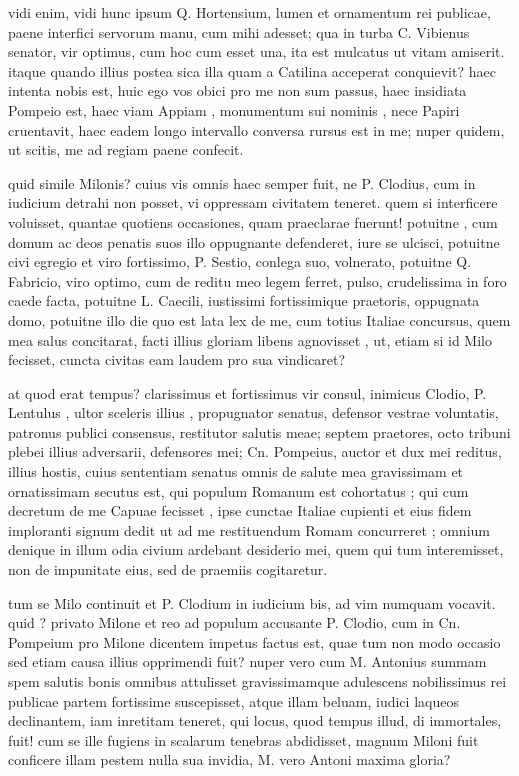  vidi enim, vidi hunc ipsum Q. Hortensium, lumen et ornamentum rei publicae, paene interfici servorum manu, cum mihi adesset; qua in turba C. Vibienus senator, vir optimus, cum hoc cum esset una, ita est mulcatus ut vitam amiserit. itaque quando illius postea sica illa quam a Catilina acceperat conquievit? haec intenta nobis est, huic ego vos obici pro me non sum passus, haec insidiata Pompeio est, haec viam Appiam , monumentum sui nominis , nece Papiri cruentavit, haec eadem longo intervallo conversa rursus est in me; nuper quidem, ut scitis, me ad regiam paene confecit.

 quid simile Milonis? cuius vis omnis haec semper fuit, ne P. Clodius, cum in iudicium detrahi non posset, vi oppressam civitatem teneret. quem si interficere voluisset, quantae quotiens occasiones, quam praeclarae fuerunt! potuitne , cum domum ac deos penatis suos illo oppugnante defenderet, iure se ulcisci, potuitne civi egregio et viro fortissimo, P. Sestio, conlega suo, volnerato, potuitne Q. Fabricio, viro optimo, cum de reditu meo legem ferret, pulso, crudelissima in foro caede facta, potuitne L. Caecili, iustissimi fortissimique praetoris, oppugnata domo, potuitne illo die quo est lata lex de me, cum totius Italiae concursus, quem mea salus concitarat, facti illius gloriam libens agnovisset , ut, etiam si id Milo fecisset, cuncta civitas eam laudem pro sua vindicaret?

 at quod erat tempus? clarissimus et fortissimus vir consul, inimicus Clodio, P. Lentulus , ultor sceleris illius , propugnator senatus, defensor vestrae voluntatis, patronus publici consensus, restitutor salutis meae; septem praetores, octo tribuni plebei illius adversarii, defensores mei; Cn. Pompeius, auctor et dux mei reditus, illius hostis, cuius sententiam senatus omnis de salute mea gravissimam et ornatissimam secutus est, qui populum Romanum est cohortatus ; qui cum decretum de me Capuae fecisset , ipse cunctae Italiae cupienti et eius fidem imploranti signum dedit ut ad me restituendum Romam concurreret ; omnium denique in illum odia civium ardebant desiderio mei, quem qui tum interemisset, non de impunitate eius, sed de praemiis cogitaretur.

 tum se Milo continuit et P. Clodium in iudicium bis, ad vim numquam vocavit. quid ? privato Milone et reo ad populum accusante P. Clodio, cum in Cn. Pompeium pro Milone dicentem impetus factus est, quae tum non modo occasio sed etiam causa illius opprimendi fuit? nuper vero cum M. Antonius summam spem salutis bonis omnibus attulisset gravissimamque adulescens nobilissimus rei publicae partem fortissime suscepisset, atque illam beluam, iudici laqueos declinantem, iam inretitam teneret, qui locus, quod tempus illud, di immortales, fuit! cum se ille fugiens in scalarum tenebras abdidisset, magnum Miloni fuit conficere illam pestem nulla sua invidia, M. vero Antoni maxima gloria?

